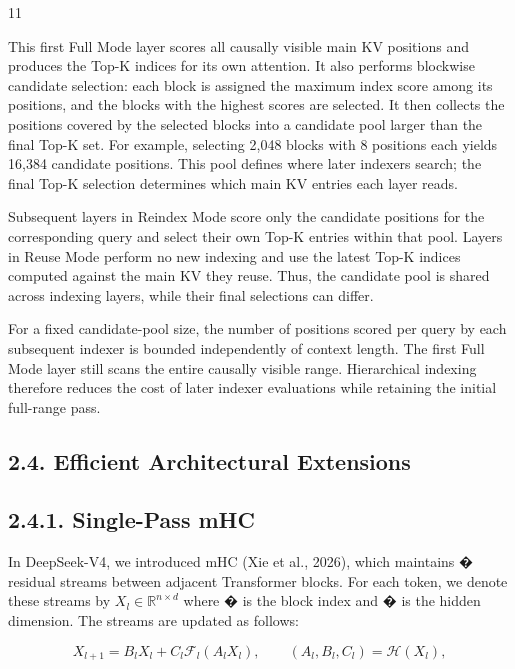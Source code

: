 \documentclass[
  10
]{article}
\begin{document}
11

This first Full Mode layer scores all causally visible main KV positions
and produces the Top-K indices for its own attention. It also performs
blockwise candidate selection: each block is assigned the maximum index
score among its positions, and the blocks with the highest scores are
selected. It then collects the positions covered by the selected blocks
into a candidate pool larger than the final Top-K set. For example,
selecting 2,048 blocks with 8 positions each yields 16,384 candidate
positions. This pool defines where later indexers search; the final
Top-K selection determines which main KV entries each layer reads.

Subsequent layers in Reindex Mode score only the candidate positions for
the corresponding query and select their own Top-K entries within that
pool. Layers in Reuse Mode perform no new indexing and use the latest
Top-K indices computed against the main KV they reuse. Thus, the
candidate pool is shared across indexing layers, while their final
selections can differ.

For a fixed candidate-pool size, the number of positions scored per
query by each subsequent indexer is bounded independently of context
length. The first Full Mode layer still scans the entire causally
visible range. Hierarchical indexing therefore reduces the cost of later
indexer evaluations while retaining the initial full-range pass.

\subsection{2.4. Efficient Architectural
Extensions}\label{efficient-architectural-extensions}

\subsection{2.4.1. Single-Pass mHC}\label{single-pass-mhc}

In DeepSeek-V4, we introduced mHC (Xie et al., 2026), which maintains �
residual streams between adjacent Transformer blocks. For each token, we
denote these streams by \(X _ { l } \in \mathbb { R } ^ { n \times d }\)
where � is the block index and � is the hidden dimension. The streams
are updated as follows:

\[
X _ { l + 1 } = B _ { l } X _ { l } + C _ { l } { \mathcal { F } } _ { l } ( A _ { l } X _ { l } ) , \qquad ( A _ { l } , B _ { l } , C _ { l } ) = { \mathcal { H } } ( X _ { l } ) ,\tag{2}
\]
\end{document}
